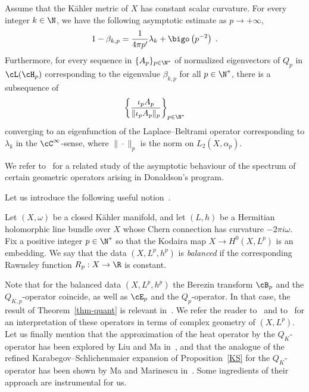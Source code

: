 \begin{theo}\label{cor-quant}
Assume that the K\"ahler metric of $X$ has constant scalar curvature. For every integer $k\in\N$, we have the following asymptotic estimate as $p\to +\infty$,
\begin{equation}\label{eq-LQ}
1-\beta_{k,p} =\frac{1}{4\pi p'}\lambda_k + \bigo\left(p^{-2}\right)\;.
\end{equation}
Furthermore, for every sequence in $\{A_p\}_{p\in\N^*}$ of normalized eigenvectors of $Q_p$ in $\cL(\cH_p)$ corresponding to the eigenvalue $\beta_{k,p}$ for all $p\in\N^*$, there is a subsequence of
\begin{equation}\label{ipAp}
\left\{ \frac{\iota_pA_p}{\|\iota_pA_p\|_p}\right\}_{p\in\N^*}
\end{equation}
converging to an eigenfunction of the Laplace--Beltrami operator corresponding to $\lambda_k$ in the $\cC^\infty$-sense, where $\|\cdot\|_p$ is the norm on $L_2(X,\alpha_p)$.
\end{theo}

We refer to~\cite{Fin12,Keller16} for a related study of the asymptotic behaviour of the spectrum of certain geometric operators arising in Donaldson's program.

Let us introduce the following useful notion~\cite{D,Fine-lectures}.


\begin{defi}\label{def-balanced}
Let $(X,\omega)$ be a closed K\"ahler manifold, and let $(L,h)$ be a Hermitian
holomorphic line bundle over $X$ whose Chern connection has curvature $-2\pi i\omega$. Fix a positive integer $p\in\N^*$ so that the Kodaira map $X \to H^0(X,L^p)$ is an embedding. We say that the data $(X,L^p,h^p)$ is \emph{balanced} if the corresponding Rawnsley function $R_p:X\rightarrow\R$ is constant.
\end{defi}


Note that for the balanced data $(X,L^p,h^p)$ the Berezin transform $\cB_p$ and the $Q_{K,p}$-operator coincide, as well as $\cE_p$ and the $Q_p$-operator. In that case, the result of Theorem~\ref{thm-quant} is relevant in~\cite[Section~4.3]{D}. We refer the reader to~\cite[Section~4.1]{D} and to~\cite[Section~1.4.1]{Fin10} for an interpretation of these operators in terms of complex geometry of $(X,L^p)$. Let us finally mention that the approximation of the heat operator by the $Q_K$-operator has been explored by Liu and Ma in~\cite{LM07}, and that the analogue of the refined Karabegov--Schlichenmaier expansion of Proposition~\ref{KS} for the $Q_K$-operator has been shown by Ma and Marinescu in~\cite[Theorem~6.1]{MM12}. Some ingredients of their approach are instrumental for us.

